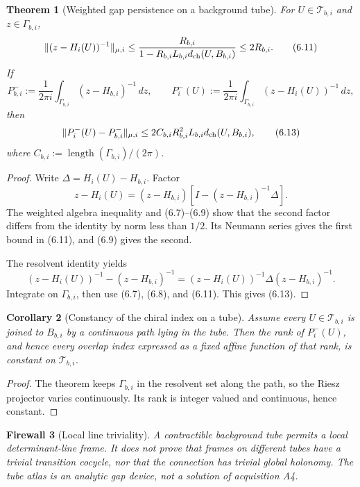 \documentclass[11pt]{article}
\newtheorem{theorem}{Theorem}[section]
\newtheorem{corollary}[theorem]{Corollary}
\newtheorem{firewall}[theorem]{Firewall}
\begin{document}
\begin{theorem}[Weighted gap persistence on a background tube]
\label{thm:v11v6-tube-gap}
For \(U\in\mathcal T_{b,i}\) and \(z\in\Gamma_{b,i}\),
\[
 \|(z-H_i(U))^{-1}\|_{\mu,i}
 \leq
 \frac{R_{b,i}}
 {1-R_{b,i}L_{b,i}d_{\rm ch}(U,B_{b,i})}
 \leq2R_{b,i}.
 \tag{6.11}
\]
If
\[
 P_{b,i}^-:=
 \frac1{2\pi i}\int_{\Gamma_{b,i}}(z-H_{b,i})^{-1}\,dz,
 \qquad
 P_i^-(U):=
 \frac1{2\pi i}\int_{\Gamma_{b,i}}(z-H_i(U))^{-1}\,dz,
 \tag{6.12}
\]
then
\[
 \|P_i^-(U)-P_{b,i}^-\|_{\mu,i}
 \leq
 2C_{b,i}R_{b,i}^2L_{b,i}
 d_{\rm ch}(U,B_{b,i}),
 \tag{6.13}
\]
where
\(C_{b,i}:=\operatorname{length}(\Gamma_{b,i})/(2\pi)\).
\end{theorem}

\begin{proof}
Write \(\Delta=H_i(U)-H_{b,i}\).  Factor
\[
 z-H_i(U)
 =
 (z-H_{b,i})
 \left[I-(z-H_{b,i})^{-1}\Delta\right].
\]
The weighted algebra inequality and (6.7)--(6.9) show that the second
factor differs from the identity by norm less than \(1/2\).  Its Neumann
series gives the first bound in (6.11), and (6.9) gives the second.

The resolvent identity yields
\[
 (z-H_i(U))^{-1}-(z-H_{b,i})^{-1}
 =
 (z-H_i(U))^{-1}\Delta(z-H_{b,i})^{-1}.
\]
Integrate on \(\Gamma_{b,i}\), then use (6.7), (6.8), and (6.11).
This gives (6.13).
\end{proof}

\begin{corollary}[Constancy of the chiral index on a tube]
\label{cor:v11v6-index}
Assume every \(U\in\mathcal T_{b,i}\) is joined to \(B_{b,i}\) by a
continuous path lying in the tube.  Then the rank of \(P_i^-(U)\), and
hence every overlap index expressed as a fixed affine function of that
rank, is constant on \(\mathcal T_{b,i}\).
\end{corollary}

\begin{proof}
The theorem keeps \(\Gamma_{b,i}\) in the resolvent set along the path, so
the Riesz projector varies continuously.  Its rank is integer valued and
continuous, hence constant.
\end{proof}

\begin{firewall}[Local line triviality]
\label{fw:v11v6-local-line}
A contractible background tube permits a local determinant-line frame.
It does not prove that frames on different tubes have a trivial transition
cocycle, nor that the connection has trivial global holonomy.  The tube
atlas is an analytic gap device, not a solution of acquisition A4.
\end{firewall}
\end{document}
